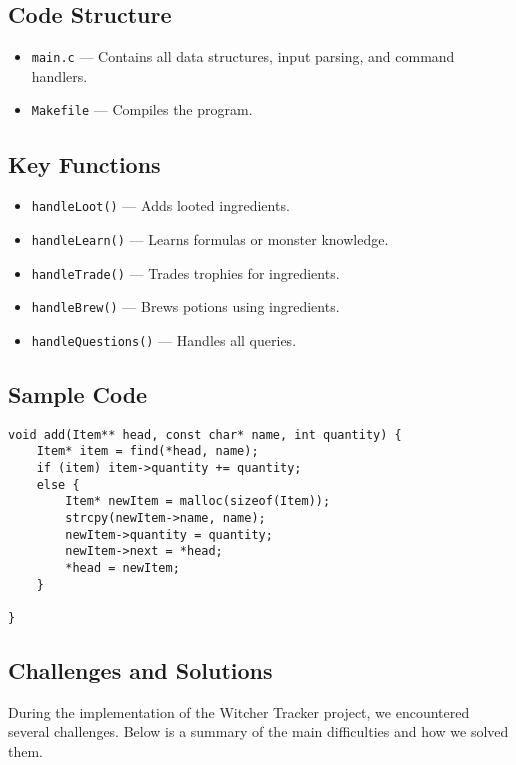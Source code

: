 \documentclass[a4paper,12pt]{article}
\begin{document}
\subsection{Code Structure}
\begin{itemize}
    \item \texttt{main.c} — Contains all data structures, input parsing, and command handlers.
    \item \texttt{Makefile} — Compiles the program.
    
\end{itemize}

\subsection{Key Functions}
\begin{itemize}
    \item \texttt{handleLoot()} — Adds looted ingredients.
    \item \texttt{handleLearn()} — Learns formulas or monster knowledge.
    \item \texttt{handleTrade()} — Trades trophies for ingredients.
    \item \texttt{handleBrew()} — Brews potions using ingredients.
    \item \texttt{handleQuestions()} — Handles all queries.
\end{itemize}

\subsection{Sample Code}
\begin{lstlisting}[style=CStyle]
void add(Item** head, const char* name, int quantity) {
    Item* item = find(*head, name);
    if (item) item->quantity += quantity;
    else {
        Item* newItem = malloc(sizeof(Item));
        strcpy(newItem->name, name);
        newItem->quantity = quantity;
        newItem->next = *head;
        *head = newItem;
    }
    
}

\end{lstlisting}

\subsection{Challenges and Solutions}

During the implementation of the Witcher Tracker project, we encountered several challenges. Below is a summary of the main difficulties and how we solved them.
\end{document}

